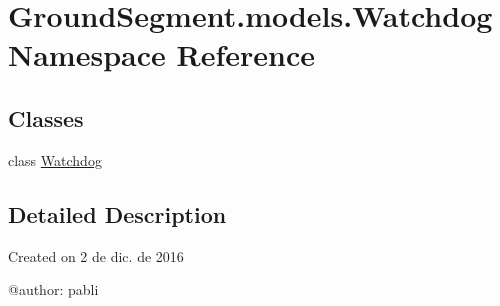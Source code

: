 \hypertarget{namespace_ground_segment_1_1models_1_1_watchdog}{}\section{Ground\+Segment.\+models.\+Watchdog Namespace Reference}
\label{namespace_ground_segment_1_1models_1_1_watchdog}
\subsection*{Classes}
\begin{DoxyCompactItemize}
\item 
class \hyperlink{class_ground_segment_1_1models_1_1_watchdog_1_1_watchdog}{Watchdog}
\end{DoxyCompactItemize}


\subsection{Detailed Description}
\begin{DoxyVerb}Created on 2 de dic. de 2016

@author: pabli
\end{DoxyVerb}
 